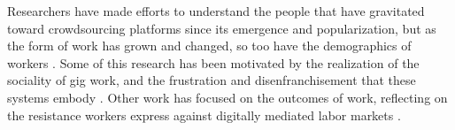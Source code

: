 \documentclass[trackingWork]{subfiles}
\begin{document}

Researchers have made efforts to understand the people
that have gravitated toward crowdsourcing platforms
since its emergence and popularization,
but as the form of work has grown and changed, so too have the demographics of workers
\cite{Ross,whoareNOTtheTurkers}.
Some of this research has been motivated by the realization of the sociality of gig work,
and the frustration and disenfranchisement that these systems embody
\cite{turkopticon,dynamo}.
Other work has focused on the outcomes of work,
reflecting on the resistance workers express against digitally mediated labor markets
\cite{uberAlgorithm}.


\end{document}
